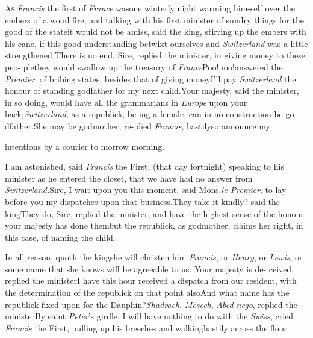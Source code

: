 \documentclass{article}
\begin{document}
\lettrine{A}{s} \textit{Francis} the first of
\textit{France} was\break one winterly night warming
him-\break self over the embers of a wood fire, and talking
with his first minister of sundry
things for the good of the state\tsk it\break
would not be amiss, said the king, stirring up the embers
with his cane, if this\break
good understanding betwixt ourselves\break
and \textit{Switzerland} was a little strengthened\break
\tsk There is no end, Sire, replied the mi\-nister, in giving
money to these peo-\break
ple\tsk they would swallow up the treasury
of \textit{France}\tsk Poo!\@ poo!\@  answered the \break
\textit{Premier}, of bribing
states, besides that\break
of giving money\tsh I’ll pay
\textit{Switzerland} the honour of standing godfather\break
for my next child.\tsk Your majesty, said the minister, in
so doing, would have all the grammarians in \textit{Europe}
upon your back;\tsk \textit{Switzerland}, as a republick,
be-\break ing a female, can in no construction be go
dfather.\tsk She
may be godmother, re-\break plied \textit{Francis}, hastily\tsk so
announce my\break\enlargethispage{\baselineskip}%

\newpage
\noindent
intentions by a courier to morrow morning.

I am astonished, said \textit{Francis} the First, (that day
fortnight) speaking to his minister as he entered the closet, that
we have had no answer from \textit{Switzerland.}\tsh Sire, I
wait upon you this moment, said Mons.\@ \textit{le Premier}, to lay
before you my dispatches upon that business.\tsk They take it
kindly? said the king\tsk They do, Sire, replied the minister,
and have the highest sense of the honour your majesty has done
them\tsh but the republick, as godmother, claims her
right, in this case, of naming the child.

In all reason, quoth the king\tsk she will christen him
\textit{Francis}, or \textit{Henry}, or \textit{Lewis}, or some name that
she knows will be agreeable to us. Your majesty is de-
ceived, replied the minister\tsk I have this hour received a
dispatch from our resident, with the determination of the
re\-publick on that point also\tsh And what name has the
republick fixed upon for the Dauphin?\tsh \textit{Shadrach},
\textit{Mesech}, \textit{Abed-nego}, replied the
minister\tsk By saint\break
\textit{Peter}’s girdle, I will have nothing to do with the
\textit{Swiss}, cried \textit{Francis} the First, pulling up
his breeches and walking\break hastily across the floor.
\end{document}
